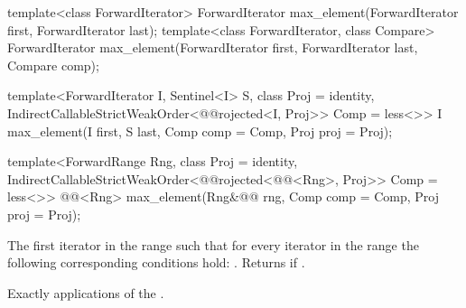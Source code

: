%
\begin{removedblock}
\begin{itemdecl}
template<class ForwardIterator>
  ForwardIterator max_element(ForwardIterator first, ForwardIterator last);
template<class ForwardIterator, class Compare>
  ForwardIterator max_element(ForwardIterator first, ForwardIterator last,
                            Compare comp);
\end{itemdecl}
\end{removedblock}
\begin{addedblock}
\begin{itemdecl}
template<ForwardIterator I, Sentinel<I> S, class Proj = identity,
    IndirectCallableStrictWeakOrder<@@rojected<I, Proj>> Comp = less<>>
  I max_element(I first, S last, Comp comp = Comp{}, Proj proj = Proj{});

template<ForwardRange Rng, class Proj = identity,
    IndirectCallableStrictWeakOrder<@@rojected<@@<Rng>, Proj>> Comp = less<>>
  @@<Rng>
    max_element(Rng&@\newtxt{\&}@ rng, Comp comp = Comp{}, Proj proj = Proj{});
\end{itemdecl}
\end{addedblock}

\begin{itemdescr}
\pnum
\returns
The first iterator
in the range
such that for every iterator
in the range
the following corresponding conditions hold:
.
Returns
if
.

\pnum
\complexity
Exactly
applications of the .
\end{itemdescr}

